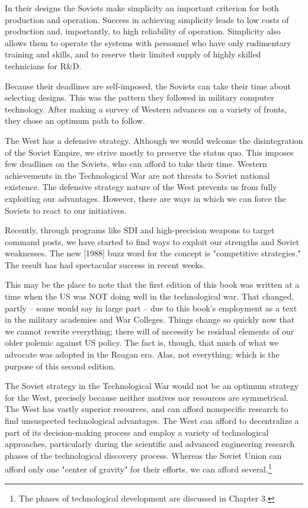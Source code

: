 In their designs the Soviets make simplicity an important criterion for both production and operation. Success in achieving simplicity leads to low costs of production and, importantly, to high reliability of operation. Simplicity also allows them to operate the systems with personnel who have only rudimentary training and skills, and to reserve their limited supply of highly skilled technicians for R\&D.

Because their deadlines are self-imposed, the Soviets can take their time about selecting designs. This was the pattern they followed in military computer technology. After making a survey of Western advances on a variety of fronts, they chose an optimum path to follow.

The West has a defensive strategy. Although we would welcome the disintegration of the Soviet Empire, we strive mostly to preserve the status quo. This imposes few deadlines on the Soviets, who can afford to take their time. Western achievements in the Technological War are not threats to Soviet national existence. The defensive strategy nature of the West prevents us from fully exploiting our advantages. However, there are ways in which we can force the Soviets to react to our initiatives.

Recently, through programs like SDI and high-precision weapons to target command posts, we have started to find ways to exploit our strengths and Soviet weaknesses. The new [1988] buzz word for the concept is "competitive strategies." The result has had spectacular success in recent weeks.

\begin{mdframed}[backgroundcolor=black!10]
This may be the place to note that the first edition of this book was written at a time when the US was NOT doing well in the technological war. That changed, partly -- some would say in large part -- due to this book's employment as a text in the military academies and War Colleges. Things change so quickly now that we cannot rewrite everything; there will of necessity be residual elements of our older polemic against US policy. The fact is, though, that much of what we advocate was adopted in the Reagan era. Alas, not everything; which is the purpose of this second edition.
\end{mdframed}

The Soviet strategy in the Technological War would not be an optimum strategy for the West, precisely because neither motives nor resources are symmetrical. The West has vastly superior resources, and can afford nonspecific research to find unsuspected technological advantages. The West can afford to decentralize a part of its decision-making process and employ a variety of technological approaches, particularly during the scientific and advanced engineering research phases of the technological discovery process. Whereas the Soviet Union can afford only one "center of gravity" for their efforts, we can afford several.\footnote{
The phases of technological development are discussed in Chapter 3.}

